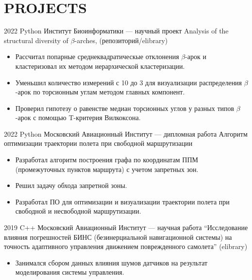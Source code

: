 \section{PROJECTS}

    \project
    {2022}
    {Python}
    {Институт Биоинформатики — научный проект}
    {Analysis of the structural diversity of $\beta$-arches, (репозиторий/elibrary)}
    \begin{itemize}
        \setlength\itemsep{-.5em}
        \item Рассчитал попарные среднеквадратическые отклонения $\beta$-арок и кластеризовал их методом иерархической кластеризации.
        \item Уменьшил количество измерений с 10 до 3 для визуализации распределения $\beta$-арок по торсионным углам методом главных компонент.
        \item Проверил гипотезу о равенстве медиан торсионных углов у разных типов $\beta$-арок с помощью T-критерия Вилкоксона.
    \end{itemize}
    
    \project
    {2022}
    {Python}
    {Московский Авиационный Институт — дипломная работа}
    {Алгоритм оптимизации траектории полета при свободной маршрутизации}
    \begin{itemize}
        \setlength\itemsep{-.5em}
        \item Разработал алгоритм построения графа по координатам ППМ (промежуточных пунктов маршрута) с учетом запретных зон.
        \item Решил задачу обхода запретной зоны.
        \item Разработал ПО для оптимизации и визуализации траектории полета при свободной и несвободной маршрутизации.
    \end{itemize}
    
    \project
    {2019}
    {C++}
    {Московский Авиационный Институт — научная работа}
    {“Исследование влияния погрешностей БИНС (безинерциальной навигационной системы) на точность адаптивного управления движением поврежденного самолета” (elibrary)}
    \begin{itemize}
        \setlength\itemsep{-.5em}
        \item Занимался сбором данных влияния шумов датчиков на результат моделирования системы управления.
    \end{itemize}
